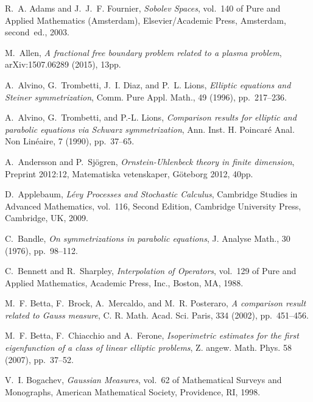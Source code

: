\documentclass[a4paper,10pt,reqno]{amsart}
\numberwithin{equation}{section}
\begin{document}
\begin{thebibliography}{10}

{\sc R.~A. Adams and J.~J.~F. Fournier}, {\em Sobolev Spaces}, vol.~140 of Pure and Applied Mathematics (Amsterdam), Elsevier/Academic Press, Amsterdam,
second~ed., 2003.

{\sc M.~Allen}, {\em A fractional free boundary problem related to a plasma problem},
arXiv:1507.06289 (2015), 13pp.

{\sc A.~Alvino, G.~Trombetti, J.~I. Diaz, and P.~L. Lions}, {\em Elliptic
  equations and {S}teiner symmetrization}, Comm. Pure Appl. Math., 49 (1996),
  pp.~217--236.

{\sc A.~Alvino, G.~Trombetti, and P.-L. Lions}, {\em Comparison results
  for elliptic and parabolic equations via {S}chwarz symmetrization}, Ann.
  Inst. H. Poincar\'e Anal. Non Lin\'eaire, 7 (1990), pp.~37--65.

{\sc A.~Andersson and P.~Sj\"ogren}, {\em Ornstein-Uhlenbeck theory in finite dimension},
Preprint 2012:12, Matematiska vetenskaper,
G\"oteborg 2012, 40pp.

{\sc D.~Applebaum}, {\em L\'evy Processes and Stochastic Calculus},
Cambridge Studies in Advanced Mathematics, vol.~116, Second Edition,
Cambridge University Press, Cambridge, UK, 2009.

{\sc C.~Bandle}, {\em On symmetrizations in parabolic equations}, J. Analyse
  Math., 30 (1976), pp.~98--112.

{\sc C.~Bennett and R.~Sharpley}, {\em Interpolation of Operators}, vol.~129 of
  Pure and Applied Mathematics, Academic Press, Inc., Boston, MA, 1988.

{\sc M.~F. Betta, F.~Brock, A.~Mercaldo, and M.~R. Posteraro}, {\em A
  comparison result related to {G}auss measure}, C. R. Math. Acad. Sci. Paris,
  334 (2002), pp.~451--456.

{\sc M.~F. Betta, F.~Chiacchio and A.~Ferone}, {\em Isoperimetric
estimates for the first eigenfunction of a class of linear elliptic problems},
Z. angew. Math. Phys. 58 (2007), pp.~37--52.

{\sc V.~I. Bogachev}, {\em Gaussian Measures}, vol.~62 of Mathematical Surveys
  and Monographs, American Mathematical Society, Providence, RI, 1998.


\end{thebibliography}
\end{document}
